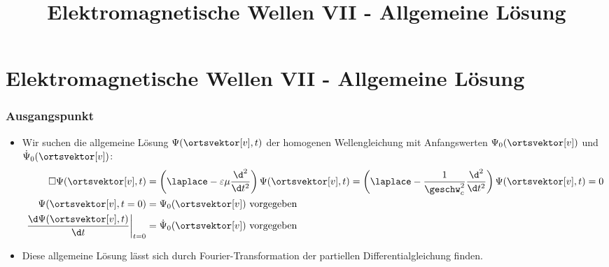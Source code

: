
 \usetikzlibrary{overlay-beamer-styles}
  
\title[TET: Elektromagnetische Wellen VII - Allgemeine Lösung]{Elektromagnetische Wellen VII - Allgemeine Lösung}


% 
% 

\maketitle

% 
% 
\section{Elektromagnetische Wellen VII - Allgemeine Lösung}

\begin{frame}
  \frametitle{Ausgangspunkt}
  \begin{itemize}[<+->]
  \item Wir suchen die \alert{allgemeine Lösung} \(\Psi(\ortsvektor[v],t)\) der \alert{homogenen Wellengleichung} mit \alert{Anfangswerten} \(\Psi_0(\ortsvektor[v])\) und \(\dot{\Psi}_0(\ortsvektor[v])\):
    \begin{align*}
      \square\Psi(\ortsvektor[v],t) &= \left(\laplace - \varepsilon\mu\frac{\d^2}{\d t^2}\right)\Psi(\ortsvektor[v],t) = \left(\laplace - \frac{1}{\geschw_c^2}\frac{\d^2}{\d t^2}\right)\Psi(\ortsvektor[v],t) = 0\\
      \Psi(\ortsvektor[v],t=0) &= \Psi_0(\ortsvektor[v]) \text{ vorgegeben}\\
      \left.\frac{\d \Psi(\ortsvektor[v],t)}{\d t}\right|_{t=0} &= \dot{\Psi}_0(\ortsvektor[v]) \text{ vorgegeben}
    \end{align*}
  \item Diese allgemeine Lösung lässt sich durch \alert{Fourier-Transformation} der partiellen Differentialgleichung finden.
    \end{itemize}
  \end{frame}


